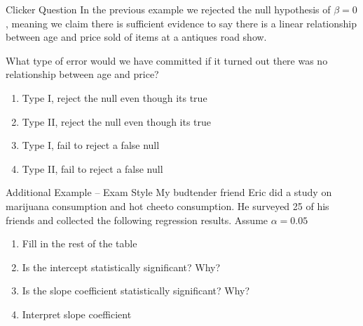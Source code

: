 \documentclass{beamer}
\begin{document}
\begin{frame}{Clicker Question}
	In the previous example we rejected the null hypothesis of $\beta=0$, meaning we claim there is sufficient evidence to say there is a linear relationship between age and price sold of items at a antiques road show. 
	
	What type of error would we have committed if it turned out there was no relationship between age and price?
	
	\begin{enumerate}[label=(\alph*)]
		\item Type I, reject the null even though its true
		\item Type II, reject the null even though its true
		\item Type I, fail to reject a false null
		\item Type II, fail to reject a false null
	\end{enumerate}
\end{frame}

\begin{frame}{Additional Example -- Exam Style}
	My budtender friend Eric did a study on marijuana consumption and hot cheeto consumption. He surveyed 25 of his friends and collected the following regression results. Assume  $\alpha=0.05$
	
	\begin{center}
	\end{center}
	\begin{enumerate}[label=(\alph*)]
		\item Fill in the rest of the table
		\item Is the intercept statistically significant? Why?
		\item Is the slope coefficient statistically significant? Why?
		\item Interpret slope coefficient
	\end{enumerate}
\end{frame}
\end{document}

